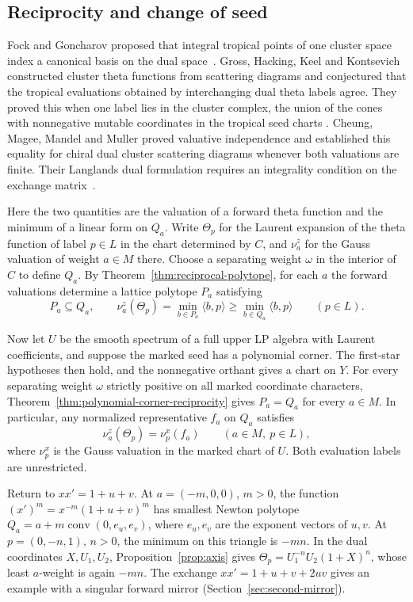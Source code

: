 \documentclass[11pt,reqno]{amsart}
\numberwithin{equation}{section}
\theoremstyle{definition}
\theoremstyle{remark}
\begin{document}
\subsection*{Reciprocity and change of seed}
Fock and Goncharov proposed that integral tropical points of one
cluster space index a canonical basis on the dual
space~\cite[Conjecture~4.1]{FG}. Gross, Hacking, Keel and Kontsevich
constructed cluster theta functions from scattering diagrams and
conjectured that the tropical evaluations obtained by interchanging
dual theta labels agree. They proved this when one label lies in the
cluster complex, the union of the cones with nonnegative mutable
coordinates in the tropical seed charts
\cite[Lemma~9.10(3) and Remark~9.11]{GHKK}. Cheung, Magee, Mandel and
Muller proved valuative independence and established this equality for
chiral dual cluster scattering diagrams whenever both valuations are finite. Their
Langlands dual formulation requires an integrality condition on the
exchange matrix~\cite[Theorem~1.1 and Corollary~4.20]{CMMM}.

Here the two quantities are the valuation of a forward theta function
and the minimum of a linear form on \(Q_a\). Write \(\Theta_p\) for
the Laurent expansion of the theta function of label \(p\in L\) in
the chart determined by \(C\), and \(\nu^z_a\) for the Gauss valuation
of weight \(a\in M\) there. Choose a separating weight \(\omega\) in the interior of \(C\) to
define \(Q_a\). By Theorem~\ref{thm:reciprocal-polytope}, for each \(a\)
the forward valuations determine a lattice polytope \(P_a\) satisfying
\[ P_a\subseteq Q_a,\qquad \nu^z_a(\Theta_p)=\min_{b\in P_a}\langle b,p\rangle\ge\min_{b\in Q_a}\langle b,p\rangle\qquad(p\in L). \]

Now let \(U\) be the smooth spectrum of a full upper LP algebra with
Laurent coefficients, and suppose the marked seed has a polynomial corner.
The first-star hypotheses then hold,
and the nonnegative orthant gives a chart on \(Y\). For every
separating weight \(\omega\) strictly positive on all marked coordinate
characters, Theorem~\ref{thm:polynomial-corner-reciprocity} gives
\(P_a=Q_a\) for every \(a\in M\). In particular, any normalized
representative \(f_a\) on \(Q_a\) satisfies
\[ \nu^z_a(\Theta_p)=\nu^x_p(f_a)\qquad(a\in M,\ p\in L), \]
where \(\nu^x_p\) is the Gauss valuation in the marked chart of \(U\).
Both evaluation labels are unrestricted.

Return to \(xx'=1+u+v\). At \(a=(-m,0,0)\), \(m>0\), the function
\((x')^m=x^{-m}(1+u+v)^m\) has smallest Newton polytope
\(Q_a=a+m\operatorname{conv}(0,e_u,e_v)\), where \(e_u,e_v\) are the
exponent vectors of \(u,v\). At \(p=(0,-n,1)\), \(n>0\), the minimum
on this triangle is \(-mn\). In the dual coordinates \(X,U_1,U_2\),
Proposition~\ref{prop:axis} gives \(\Theta_p=U_1^{-n}U_2(1+X)^n\),
whose least \(a\)-weight is again \(-mn\). The exchange
\(xx'=1+u+v+2uv\) gives an example with a singular forward mirror
(Section~\ref{sec:second-mirror}).
\end{document}
